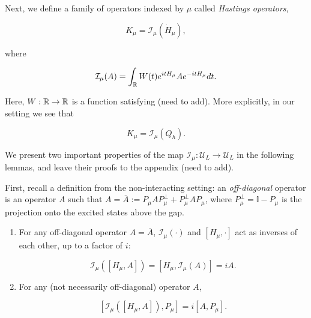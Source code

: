 \documentclass[12pt, letterpaper]{article}
\begin{document}
Next, we define a family of operators indexed by $\mu$ called \emph{Hastings operators},

\[K_\mu = \mathcal{I}_{\mu}(\dot{H}_\mu),\]

where 

\[\mathcal{I}_{\mu} (A) = \int_{\mathbb{R}} W(t) e^{itH_\mu} A e^{-itH_\mu}dt.\]

Here, $W:\mathbb{R}\to\mathbb{R}$ is a function satisfying (need to add). More explicitly, in our setting we see that 

\[K_\mu = \mathcal{I}_\mu(Q_h).\]


We present two important properties of the map $\mathcal{I}_\mu:\mathcal{U}_L\to\mathcal{U}_L$ in the following lemmas, and leave their proofs to the appendix (need to add). 

First, recall a definition from the non-interacting setting: an \emph{off-diagonal} operator is an operator $A$ such that $A = \overline{A} := P_\mu AP_\mu^\perp + P_\mu^\perp AP_\mu$, where $P_\mu^\perp = \mathbb{I} - P_\mu$ is the projection onto the excited states above the gap.

\begin{lemma}
\begin{enumerate}
\item For any off-diagonal operator $A=\overline{A}$, $\mathcal{I}_\mu(\cdot)$ and $[H_\mu, \cdot]$ act as inverses of each other, up to a factor of $i$:

\[\mathcal{I}_\mu\left([H_\mu, A]\right) = [H_\mu, \mathcal{I}_\mu(A)] = iA.\]

\item For any (not necessarily off-diagonal) operator $A$, 

\[[\mathcal{I}_\mu([H_\mu, A]),P_\mu] = i[A,P_\mu].\]
\end{enumerate}
\label{lemma:inverseofH}
\end{lemma}




\end{document}
